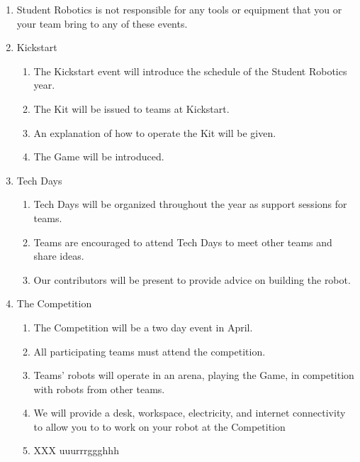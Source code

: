 \documentclass[a4paper, 11pt]{scrartcl}
\begin{document}
\begin{enumerate}
\begin{enumerate}
\item Student Robotics is not responsible for any tools or equipment that you
or your team bring to any of these events.

\item Kickstart

\begin{enumerate}
\item The Kickstart event will introduce the schedule of the Student Robotics
year.

\item The Kit will be issued to teams at Kickstart.

\item An explanation of how to operate the Kit will be given.

\item The Game will be introduced.
\end{enumerate}

\item Tech Days

\begin{enumerate}
\item Tech Days will be organized throughout the year as support sessions for
teams.

\item Teams are encouraged to attend Tech Days to meet other teams and share
ideas.

\item Our contributors will be present to provide advice on building the robot.
\end{enumerate}

\item The Competition
\begin{enumerate}

\item The Competition will be a two day event in April.

\item All participating teams must attend the competition.

\item Teams' robots will operate in an arena, playing the Game, in competition
with robots from other teams.

\item We will provide a desk, workspace, electricity, and internet connectivity
to allow you to to work on your robot at the Competition

\item XXX uuurrrggghhh


\end{enumerate}
\end{enumerate}
\end{enumerate}
\end{document}
